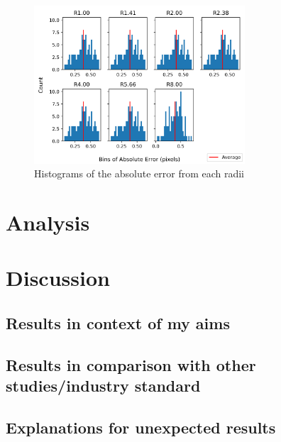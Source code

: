 \documentclass[aps,pra,a4paper,nofootinbib,onecolumn,tightenlines,longbibliography,12pt,amsfonts,amssymb,amsmath,floatfix]{revtex4-2} %
\begin{document}
  \begin{figure}[H]
    \begin{center}
      \includegraphics[width=0.7\textwidth]{project_pics/histogram_no_noise_all_r.png}
    \end{center}
    \caption{Histograms of the absolute error from each radii}
    \label{fig:}
  \end{figure}

  
  
  
      
\section{Analysis}
\label{sec:Analysis}


\section{Discussion} %
\label{sec:Discussion}


  \subsection{Results in context of my aims} %
  \label{sub:Results in context of my aims}

  \subsection{Results in comparison with other studies/industry standard} %
  \label{sub:Results in comparison with other studies/industry standard}
  
  \subsection{Explanations for unexpected results} %
  \label{sub:Explanations for unexpected results}
  
\end{document}
